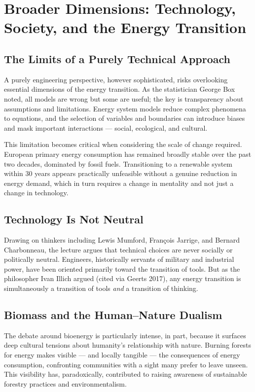 \section{Broader Dimensions: Technology, Society, and the Energy Transition}

\subsection{The Limits of a Purely Technical Approach}

A purely engineering perspective, however sophisticated, risks overlooking essential dimensions of the energy transition. As the statistician George Box noted, all models are wrong but some are useful; the key is transparency about assumptions and limitations. Energy system models reduce complex phenomena to equations, and the selection of variables and boundaries can introduce biases and mask important interactions — social, ecological, and cultural.

This limitation becomes critical when considering the scale of change required. European primary energy consumption has remained broadly stable over the past two decades, dominated by fossil fuels. Transitioning to a renewable system within 30 years appears practically unfeasible without a genuine reduction in energy demand, which in turn requires a change in mentality and not just a change in technology.

\subsection{Technology Is Not Neutral}

Drawing on thinkers including Lewis Mumford, François Jarrige, and Bernard Charbonneau, the lecture argues that technical choices are never socially or politically neutral. Engineers, historically servants of military and industrial power, have been oriented primarily toward the transition of tools. But as the philosopher Ivan Illich argued (cited via Geerts 2017), any energy transition is simultaneously a transition of tools \textit{and} a transition of thinking.

\subsection{Biomass and the Human–Nature Dualism}

The debate around bioenergy is particularly intense, in part, because it surfaces deep cultural tensions about humanity's relationship with nature. Burning forests for energy makes visible — and locally tangible — the consequences of energy consumption, confronting communities with a sight many prefer to leave unseen. This visibility has, paradoxically, contributed to raising awareness of sustainable forestry practices and environmentalism.

